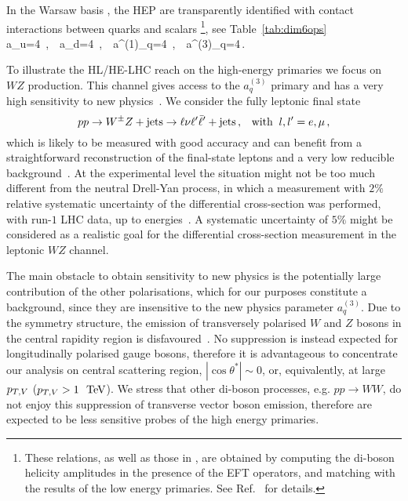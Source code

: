 In the Warsaw basis \cite{Grzadkowski:2010es}, the HEP are transparently identified with contact interactions between quarks and scalars \footnote{These relations, as well as those in  , are obtained by computing the di-boson helicity amplitudes in the presence of the EFT operators, and matching with the results of the low energy primaries. See Ref.~\cite{Franceschini:2017ab} for details.}, see Table~\ref{tab:dim6ops}
\be
a_u=4\ ,\  \ a_d=4\ ,\ \  a^{(1)}_q=4\ ,\ \  a^{(3)}_q=4\,.
\ee


To illustrate the HL/HE-LHC reach on the high-energy primaries we focus on $WZ$ production. This channel gives access to the
$a_q^{(3)}$ primary and has a very high sensitivity to new physics~\cite{Franceschini:2017ab}. We consider the fully leptonic final state
$$
pp\to W^{\pm}Z + {\rm{jets}}\to \ell\nu\ell^{\prime}\bar{\ell}^{\prime} + {\rm{jets}} \,, \;\;\; {\rm{with}}\;\;l,l'=e,\mu\,,
$$ 
which is likely to be measured with good accuracy and can benefit from a straightforward reconstruction of the final-state
leptons and a very low reducible background~\cite{Aad:2016ett}. At the experimental level
the situation might not be too much different from the neutral Drell-Yan process, in which a measurement with $2\%$
relative systematic uncertainty of the differential cross-section was performed, with run-$1$ LHC data,
up to \UTeV energies~\cite{Aad:2016zzw}.
A systematic uncertainty of $5\%$ might be considered as a realistic goal for the differential cross-section measurement in the leptonic $WZ$ channel. 

The main obstacle to obtain sensitivity to new physics is the potentially large contribution of the other polarisations, which for our purposes constitute a background, since they are insensitive to the new physics parameter $a_{q}^{(3)}$. %
Due to the symmetry structure, the emission of transversely polarised $W$ and $Z$ bosons in the central rapidity region is disfavoured~\cite{Franceschini:2017ab}. No suppression is instead expected for longitudinally polarised gauge bosons, therefore it is advantageous to concentrate our analysis on central scattering region, $|\cos \theta^*| \sim 0$, or, equivalently, at large $p_{T,V}$ ($p_{T,V} > 1\ {\rm ~\text{TeV}}$). We stress that other di-boson processes, e.g. $pp \to WW$, do not enjoy this suppression of transverse vector boson emission, therefore are expected to be less sensitive probes of the high energy primaries. %

